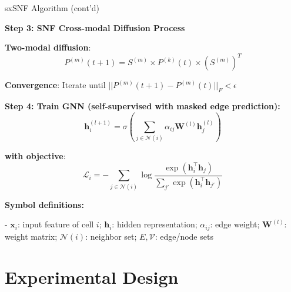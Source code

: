 \documentclass{beamer}
\begin{document}
\begin{frame}{sxSNF Algorithm (cont'd)}

\footnotesize
\textbf{Step 3: SNF Cross-modal Diffusion Process}

\textbf{Two-modal diffusion}:
\[
P^{(m)}(t+1) = S^{(m)} \times P^{(k)}(t) \times (S^{(m)})^T
\]

\textbf{Convergence}: Iterate until $||P^{(m)}(t+1) - P^{(m)}(t)||_F < \epsilon$

\vspace{0.1cm}

\textbf{Step 4: Train GNN (self-supervised with masked edge prediction):}
\[
\mathbf{h}_i^{(l+1)} = \sigma\!\left(\sum_{j\in\mathcal{N}(i)} \alpha_{ij} \mathbf{W}^{(l)} \mathbf{h}_j^{(l)}\right)
\]

\textbf{with objective}:
\[
\mathcal{L}_i = -\sum_{j \in \mathcal{N}(i)} \log \frac{\exp(\mathbf{h}_i^\top\mathbf{h}_j)}{\sum_{j'} \exp(\mathbf{h}_i^\top\mathbf{h}_{j'})}
\]

\textbf{Symbol definitions:}

\scriptsize
- $\mathbf{x}_i$: input feature of cell $i$; $\mathbf{h}_i$: hidden representation; $\alpha_{ij}$: edge weight; $\mathbf{W}^{(l)}$: weight matrix;  $\mathcal{N}(i)$: neighbor set; $E,\mathcal{V}$: edge/node sets
\end{frame}














\section{Experimental Design}
\end{document}
